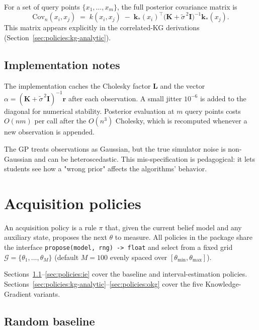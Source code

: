 \documentclass[11pt]{article}
\newcommand{\Cov}{\mathrm{Cov}}
\newcommand{\Cstar}{\theta}
\newcommand{\sigTilde}{\tilde{\sigma}}
\newcommand{\code}[1]{\texttt{#1}}
\begin{document}
For a set of query points $\{x_1, \dots, x_m\}$, the full posterior
covariance matrix is
\[
  \Cov_n(x_i, x_j) \;=\; k(x_i, x_j) \;-\; \mathbf{k}_*(x_i)^{\!\top}\bigl(\mathbf{K} + \sigTilde^{\,2}\mathbf{I}\bigr)^{-1}\mathbf{k}_*(x_j).
\]
This matrix appears explicitly in the correlated-KG derivations
(Section~\ref{sec:policies:kg-analytic}).

\subsection{Implementation notes}
\label{sec:gp:impl}

The implementation caches the Cholesky factor $\mathbf{L}$ and the vector
$\alpha = (\mathbf{K} + \sigTilde^{\,2}\mathbf{I})^{-1}\mathbf{r}$ after each
observation. A small jitter $10^{-6}$ is added to the diagonal for numerical
stability. Posterior evaluation at $m$ query points costs $O(nm)$ per call
after the $O(n^3)$ Cholesky, which is recomputed whenever a new observation
is appended.

The GP treats observations as Gaussian, but the true simulator noise is
non-Gaussian and can be heteroscedastic. This mis-specification is
pedagogical: it lets students see how a "wrong prior" affects the
algorithms' behavior.

\section{Acquisition policies}
\label{sec:policies}

An acquisition policy is a rule $\pi$ that, given the current belief model
and any auxiliary state, proposes the next $\Cstar$ to measure. All
policies in the package share the interface
\code{propose(model, rng) -> float} and select from a fixed grid
$\mathcal{G} = \{\Cstar_1, \dots, \Cstar_M\}$ (default $M=100$ evenly spaced
over $[\Cstar_{\min}, \Cstar_{\max}]$).

Sections~\ref{sec:policies:random}--\ref{sec:policies:ie} cover the
baseline and interval-estimation policies.
Sections~\ref{sec:policies:kg-analytic}--\ref{sec:policies:okg} cover the
five Knowledge-Gradient variants.

\subsection{Random baseline}
\label{sec:policies:random}
\end{document}

